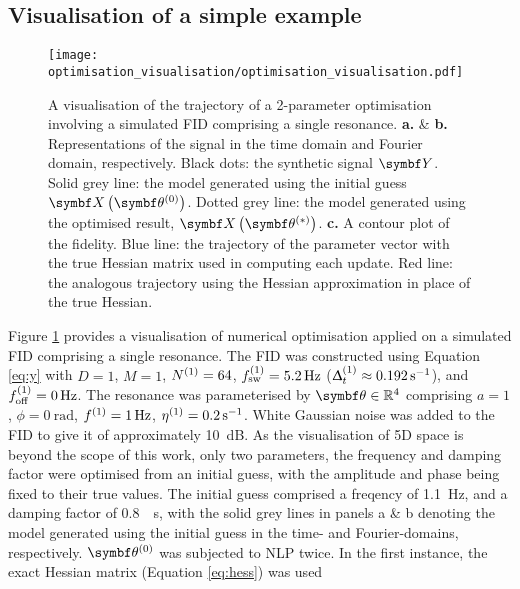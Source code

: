 \subsection{Visualisation of a simple example}
\label{subsec:optim-vis}
\begin{figure}
    \centering
    \texttt{[image: optimisation\_visualisation/optimisation\_visualisation.pdf]}
    \caption[
        A visualisation of the trajectory of a 2-parameter optimisation
        involving a simulated \acs{FID} comprising a single resonance.
    ]
    {
        A visualisation of the trajectory of a 2-parameter optimisation
        involving a simulated \acs{FID} comprising a single resonance.
        \textbf{a.} \& \textbf{b.} Representations of the signal in
        the time domain and Fourier domain, respectively.
        Black dots: the synthetic signal $\bY$.
        Solid grey line: the model generated
        using the initial guess $\bX \left( \bthzero \right)$.
        Dotted grey line: the model generated using the optimised result, $\bX
        \left( \bthstar \right)$.
        \textbf{c.} A contour plot of the fidelity.
        Blue line: the trajectory of the parameter vector with the true
        Hessian matrix used in computing each update.
        Red line: the analogous trajectory using the Hessian approximation
        in place of the true Hessian.
    }
    \label{fig:optim-vis}
\end{figure}
Figure \ref{fig:optim-vis} provides a visualisation of numerical optimisation
applied on a simulated \ac{FID} comprising a single resonance.
The FID was constructed using Equation \ref{eq:y} with $D=1$, $M=1$, $N^{(1)} =
64$, $f_{\mathrm{sw}}^{(1)} = \qty{5.2}{\hertz}$ ($\Updelta_t^{(1)} \approx \qty{0.192}{\per\second}$),
and $f_{\mathrm{off}}^{(1)} = \qty{0}{\hertz}$.
The resonance was parameterised by $\bth \in \mathbb{R}^4$ comprising $a=1$,
$\phi=\qty{0}{\radian}$, $f^{(1)}=\qty{1}{\hertz}$, $\eta^{(1)}=\qty{0.2}{\per\second}$.
White Gaussian noise was added to the FID to give it  of approximately
\qty{10}{\deci\bel}. As the visualisation of 5D space is beyond the scope of
this work, only two parameters, the frequency and damping factor were optimised
from an initial guess, with the amplitude and phase being fixed to their true
values. The initial guess comprised a freqency of \qty{1.1}{\hertz}, and a
damping factor of \qty{0.8}{\per\second}, with the solid grey lines in panels a
\& b denoting the model generated using the initial guess in the time- and
Fourier-domains, respectively. $\bthzero$ was subjected to \ac{NLP} twice. In
the first instance, the exact Hessian matrix (Equation \ref{eq:hess}) was used
